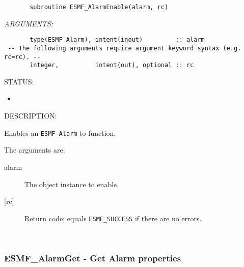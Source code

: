  
\begin{verbatim}       subroutine ESMF_AlarmEnable(alarm, rc)
 \end{verbatim}{\em ARGUMENTS:}
\begin{verbatim}       type(ESMF_Alarm), intent(inout)         :: alarm
 -- The following arguments require argument keyword syntax (e.g. rc=rc). --
       integer,          intent(out), optional :: rc
 \end{verbatim}
{\sf STATUS:}
   \begin{itemize}
   \item{}
   \end{itemize}
  
{\sf DESCRIPTION:\\ }


       Enables an {\tt ESMF\_Alarm} to function.
  
       The arguments are:
       \begin{description}
       \item[alarm]
            The object instance to enable.
       \item[{[rc]}]
            Return code; equals {\tt ESMF\_SUCCESS} if there are no errors.
       \end{description} 
 
\mbox{}\hrulefill\ 
 
\subsubsection [ESMF\_AlarmGet] {ESMF\_AlarmGet - Get Alarm properties}


